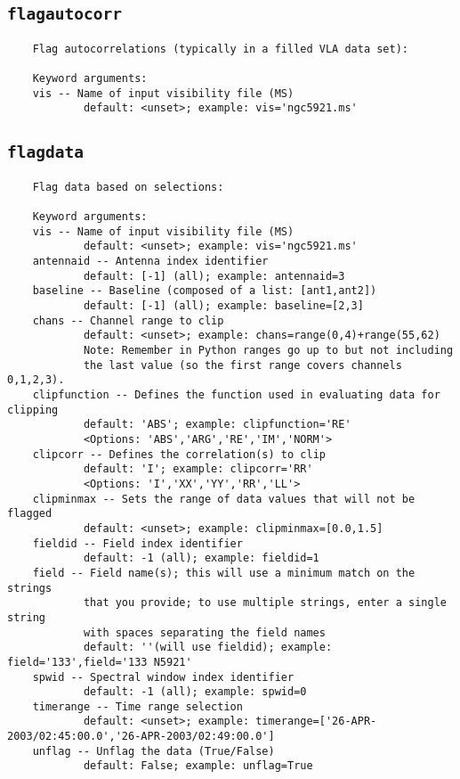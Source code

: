 \subsection{{\tt flagautocorr}}
\label{section:tasks.flagautocorr}

\small
\begin{verbatim}
    Flag autocorrelations (typically in a filled VLA data set):
    
    Keyword arguments:
    vis -- Name of input visibility file (MS)
            default: <unset>; example: vis='ngc5921.ms'

\end{verbatim}
\normalsize


\subsection{{\tt flagdata}}
\label{section:tasks.flagdata}

\small
\begin{verbatim}
    Flag data based on selections:
    
    Keyword arguments:
    vis -- Name of input visibility file (MS)
            default: <unset>; example: vis='ngc5921.ms'
    antennaid -- Antenna index identifier
            default: [-1] (all); example: antennaid=3
    baseline -- Baseline (composed of a list: [ant1,ant2])
            default: [-1] (all); example: baseline=[2,3]
    chans -- Channel range to clip
            default: <unset>; example: chans=range(0,4)+range(55,62)
            Note: Remember in Python ranges go up to but not including
            the last value (so the first range covers channels 0,1,2,3).
    clipfunction -- Defines the function used in evaluating data for clipping
            default: 'ABS'; example: clipfunction='RE'
            <Options: 'ABS','ARG','RE','IM','NORM'>
    clipcorr -- Defines the correlation(s) to clip
            default: 'I'; example: clipcorr='RR'
            <Options: 'I','XX','YY','RR','LL'>
    clipminmax -- Sets the range of data values that will not be flagged
            default: <unset>; example: clipminmax=[0.0,1.5]
    fieldid -- Field index identifier
            default: -1 (all); example: fieldid=1
    field -- Field name(s); this will use a minimum match on the strings
            that you provide; to use multiple strings, enter a single string
            with spaces separating the field names
            default: ''(will use fieldid); example: field='133',field='133 N5921'
    spwid -- Spectral window index identifier
            default: -1 (all); example: spwid=0
    timerange -- Time range selection
            default: <unset>; example: timerange=['26-APR-2003/02:45:00.0','26-APR-2003/02:49:00.0']
    unflag -- Unflag the data (True/False)
            default: False; example: unflag=True
\end{verbatim}
\normalsize


